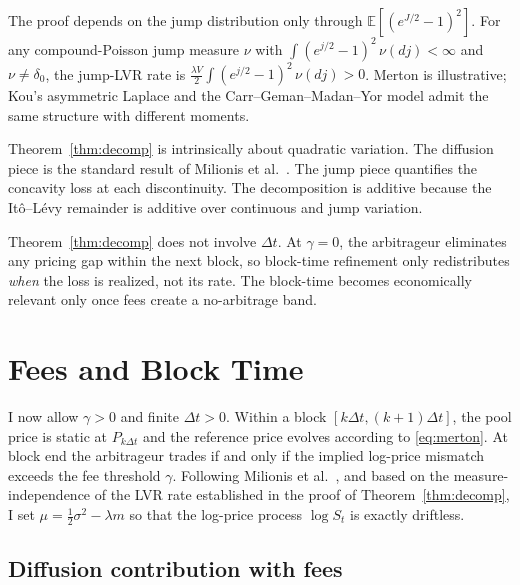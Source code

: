 \documentclass[runningheads]{llncs}
\newcommand{\E}{\mathbb{E}}
\newcommand{\dt}{\Delta t}
\newcommand{\1}{\mathbf{1}}
\begin{document}
\begin{remark}\label{rem:generaljumps}
The proof depends on the jump distribution only through $\E[(e^{J/2}-1)^2]$. For any compound-Poisson jump measure $\nu$ with $\int (e^{j/2}-1)^2\,\nu(dj) < \infty$ and $\nu \neq \delta_0$, the jump-LVR rate is $\tfrac{\lambda V}{2}\int (e^{j/2}-1)^2\,\nu(dj) > 0$. Merton is illustrative; Kou's asymmetric Laplace and the Carr--Geman--Madan--Yor model admit the same structure with different moments.
\end{remark}

\begin{remark}\label{rem:atomic}
Theorem~\ref{thm:decomp} is intrinsically about quadratic variation. The diffusion piece is the standard result of Milionis et al.~\cite{milionis2022automated}. The jump piece quantifies the concavity loss at each discontinuity. The decomposition is additive because the It\^o--L\'evy remainder is additive over continuous and jump variation.
\end{remark}

\begin{remark}\label{rem:dtinvariant}
Theorem~\ref{thm:decomp} does not involve $\dt$. At $\gamma=0$, the arbitrageur eliminates any pricing gap within the next block, so block-time refinement only redistributes \emph{when} the loss is realized, not its rate. The block-time becomes economically relevant only once fees create a no-arbitrage band.
\end{remark}

\section{Fees and Block Time}\label{sec:fees}

I now allow $\gamma > 0$ and finite $\dt > 0$. Within a block $[k\dt, (k+1)\dt]$, the pool price is static at $P_{k\dt}$ and the reference price evolves according to \eqref{eq:merton}. At block end the arbitrageur trades if and only if the implied log-price mismatch exceeds the fee threshold $\gamma$. Following Milionis et al.~\cite{milionis2023automated}, and based on the measure-independence of the LVR rate established in the proof of Theorem~\ref{thm:decomp}, I set $\mu = \tfrac{1}{2}\sigma^2 - \lambda m$ so that the log-price process $\log S_t$ is exactly driftless.

\subsection{Diffusion contribution with fees}
\end{document}
